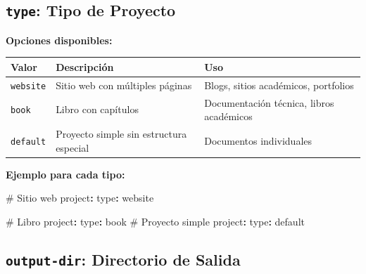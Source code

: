 \documentclass[
  doc,
  floatsintext,
  longtable,
  a4paper,
  nolmodern,
  notxfonts,
  notimes,
  12pt,
  colorlinks=true,linkcolor=blue,citecolor=blue,urlcolor=blue]{apa7}
\newenvironment{Shaded}{\begin{snugshade}}{\end{snugshade}}
\newcommand{\AttributeTok}[1]{\textcolor[rgb]{0.40,0.45,0.13}{#1}}
\newcommand{\CommentTok}[1]{\textcolor[rgb]{0.37,0.37,0.37}{#1}}
\newcommand{\FunctionTok}[1]{\textcolor[rgb]{0.28,0.35,0.67}{#1}}
\newcommand{\KeywordTok}[1]{\textcolor[rgb]{0.00,0.23,0.31}{\textbf{#1}}}
\newcounter{none} %
\begin{document}
\subsection{\texorpdfstring{\texttt{type}: Tipo de
Proyecto}{type: Tipo de Proyecto}}\label{type-tipo-de-proyecto}

\textbf{Opciones disponibles:}

{\def\LTcaptype{none} %
\begin{longtable}[]{@{}
  >{\raggedright\arraybackslash}p{}
  >{\raggedright\arraybackslash}p{}
  >{\raggedright\arraybackslash}p{}@{}}
\toprule\noalign{}
\begin{minipage}[b]{\linewidth}\raggedright
Valor
\end{minipage} & \begin{minipage}[b]{\linewidth}\raggedright
Descripción
\end{minipage} & \begin{minipage}[b]{\linewidth}\raggedright
Uso
\end{minipage} \\
\midrule\noalign{}
\endhead
\bottomrule\noalign{}
\endlastfoot
\texttt{website} & Sitio web con múltiples páginas & Blogs, sitios
académicos, portfolios \\
\texttt{book} & Libro con capítulos & Documentación técnica, libros
académicos \\
\texttt{default} & Proyecto simple sin estructura especial & Documentos
individuales \\
\end{longtable}
}

\textbf{Ejemplo para cada tipo:}

\begin{Shaded}
\begin{Highlighting}[]
\CommentTok{\# Sitio web}
\FunctionTok{project}\KeywordTok{:}
\AttributeTok{  }\FunctionTok{type}\KeywordTok{:}\AttributeTok{ website}

\CommentTok{\# Libro}
\FunctionTok{project}\KeywordTok{:}
\AttributeTok{  }\FunctionTok{type}\KeywordTok{:}\AttributeTok{ book}
\AttributeTok{  }
\CommentTok{\# Proyecto simple}
\FunctionTok{project}\KeywordTok{:}
\AttributeTok{  }\FunctionTok{type}\KeywordTok{:}\AttributeTok{ default}
\end{Highlighting}
\end{Shaded}

\subsection{\texorpdfstring{\texttt{output-dir}: Directorio de
Salida}{output-dir: Directorio de Salida}}\label{output-dir-directorio-de-salida}
\end{document}
